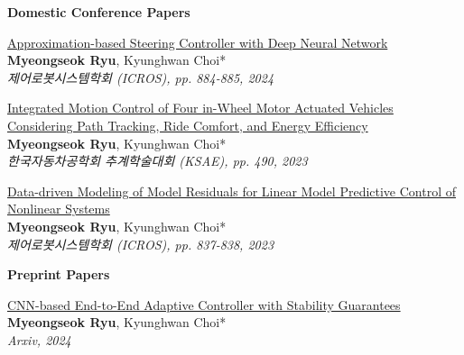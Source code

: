 \textbf{Domestic Conference Papers}

\small{\begin{etaremune}

    \item {
        \href{https://www.dbpia.co.kr/journal/articleDetail?nodeId=NODE11909146}{Approximation-based Steering Controller with Deep Neural Network}
        \\
        \textbf{Myeongseok Ryu}, Kyunghwan Choi*
        \\
        \textit{
            제어로봇시스템학회 (ICROS), pp. 884-885, 2024
        }
    }

    \item {
        \href{https://www.dbpia.co.kr/journal/articleDetail?nodeId=NODE11665897}{Integrated Motion Control of Four in-Wheel Motor Actuated Vehicles Considering Path Tracking, Ride Comfort, and Energy Efficiency}
        \\
        \textbf{Myeongseok Ryu}, Kyunghwan Choi*
        \\
        \textit{
            한국자동차공학회 추계학술대회 (KSAE), pp. 490, 2023
        }
    }

    \item {
        \href{https://www.dbpia.co.kr/journal/articleDetail?nodeId=NODE11480596}{Data-driven Modeling of Model Residuals for Linear Model Predictive Control of Nonlinear Systems}
        \\
        \textbf{Myeongseok Ryu}, Kyunghwan Choi*
        \\
        \textit{
            제어로봇시스템학회 (ICROS), pp. 837-838, 2023
        }
    }

\end{etaremune}}
    
\textbf{Preprint Papers}

\small{\begin{etaremune}

    \item {
        \href{https://doi.org/10.48550/arXiv.2403.03499}{CNN-based End-to-End Adaptive Controller with Stability Guarantees}
        \\
        \textbf{Myeongseok Ryu}, Kyunghwan Choi*
        \\
        \textit{
            Arxiv, 2024
        }
    }

\end{etaremune}}
    